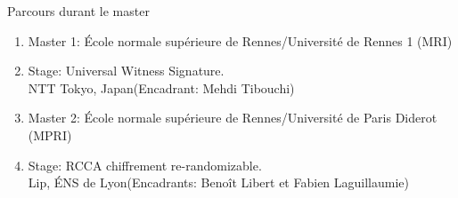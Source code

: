 \begin{frame}{Parcours durant le master}
  
  \begin{enumerate}
  \item Master 1: \'Ecole normale sup\'erieure de Rennes/Universit\'e de Rennes 1 (MRI)  
  \item Stage: Universal Witness Signature. \\NTT Tokyo, Japan(Encadrant: Mehdi Tibouchi)
  \item Master 2: \'Ecole normale sup\'erieure de Rennes/Universit\'e de Paris Diderot (MPRI)
  \item Stage: RCCA chiffrement re-randomizable. \\Lip, \'ENS de Lyon(Encadrants: Beno\^it Libert et Fabien Laguillaumie)
  \end{enumerate}
  
\end{frame}